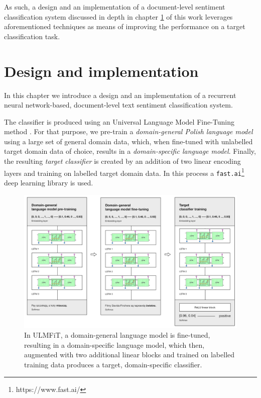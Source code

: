 As such, a design and an implementation of a document-level sentiment classification system discussed in depth in chapter \ref{chapter:projectandimplementation} of this work leverages aforementioned techniques as means of improving the performance on a target classification task.

\chapter{Design and implementation}
\label{chapter:projectandimplementation}

In this chapter we introduce a design and an implementation of a recurrent neural network-based, document-level text sentiment classification system.

The classifier is produced using an Universal Language Model Fine-Tuning method \cite{ulmfit}. For that purpose, we pre-train a \emph{domain-general Polish language model} using a large set of general domain data, which, when fine-tuned with unlabelled target domain data of choice, results in a \emph{domain-specific language model}. Finally, the resulting \emph{target classifier} is created by an addition of two linear encoding layers and training on labelled target domain data. In this process a \lstinline{fast.ai}\footnote{https://www.fast.ai/} deep learning library is used. 

\begin{figure}[]
\centering
\includegraphics[scale=0.8]{figures/ulmfit.png}
\caption{In ULMFiT, a domain-general language model is fine-tuned, resulting in a domain-specific language model, which then, augmented with two additional linear blocks and trained on labelled training data produces a target, domain-specific classifier.} 
\label{ulmfit:process}
\end{figure}

